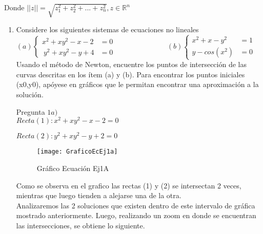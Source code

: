 \documentclass{udpreport}
\begin{document}
        Donde $||z||=\sqrt{z_{1}^{2} + z_{2}^2+...+z_{n}^{2}} , z \in \mathbb{R}^{n}$
    \begin{enumerate}   
        
        \item Considere los siguientes sistemas de ecuaciones no lineales\\
        
        \begin{math}
            (a)\left\lbrace
          \begin{array}{ll}
                x^2 + xy^2-x-2&=0 \\\
                y^2 + xy^2-y+4&=0
            \end{array}
            \right.
            \hspace{3cm}
            (b) \left\lbrace
           \begin{array}{ll}
                 x^2+x-y^2&=1  \\
                 y-cos(x^2)&=0 
            \end{array}
            \right.
        \end{math}\\
        
        Usando el método de Newton, encuentre los puntos de intersección de las curvas descritas en los ítem (a) y (b). Para encontrar los puntos iniciales (x0,y0), apóyese en gráficos que le permitan encontrar una aproximación a la solución.
        
        
        Pregunta $ 1a) $\\
        
            
            $ Recta(1) : x^2+xy^2-x-2=0 $
            
            $ Recta(2) : y^2 +xy^2-y+2=0 $
            
            \begin{figure}[h]
                \centering
                \texttt{[image: GraficoEcEj1a]}
                 \caption{Gráfico Ecuación Ej1A}
            \end{figure}
            
            Como se observa en el grafico las rectas (1) y (2) se intersectan 2 veces, mientras que luego tienden a alejarse una de la otra. \\Analizaremos las 2 soluciones que existen dentro de este intervalo de gráfica mostrado anteriormente. Luego, realizando un zoom en donde se encuentran las intersecciones, se obtiene lo siguiente.\\
            

\end{enumerate}
\end{document}
